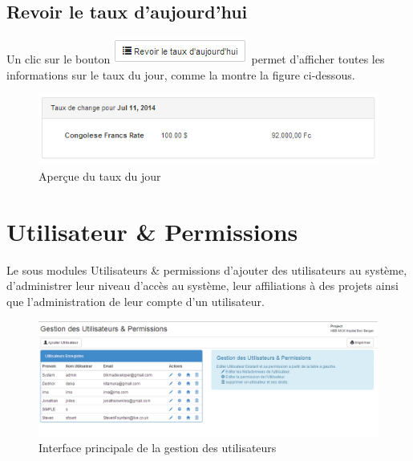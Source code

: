 \documentclass[12pt,a4paper]{report}
\begin{document}
\subsection{Revoir le taux d'aujourd'hui}
Un clic sur le bouton \includegraphics[scale=0.7]{pic/RevoirTaux.png} permet d'afficher toutes les informations sur le taux du jour, comme la montre la figure ci-dessous.
\begin{figure}[h]
\begin{center}
\includegraphics[width=12cm]{pic/ShowRate.png}
\end{center}
\caption{Aperçue du taux du jour}
\label{Aperçue du taux du jour}
\end{figure}




\newpage
\section{Utilisateur \& Permissions}
Le sous modules Utilisateurs \& permissions d'ajouter des utilisateurs au système, d'administrer leur niveau d'accès au système, leur affiliations à des projets ainsi que l'administration de leur compte d'un utilisateur.

\begin{figure}[h]
\begin{center}
\includegraphics[width=14cm]{pic/userAllow.png}
\end{center}
\caption{Interface principale de la gestion des utilisateurs}
\label{Interface principale de la gestion des utilisateurs}
\end{figure} 
\end{document}
